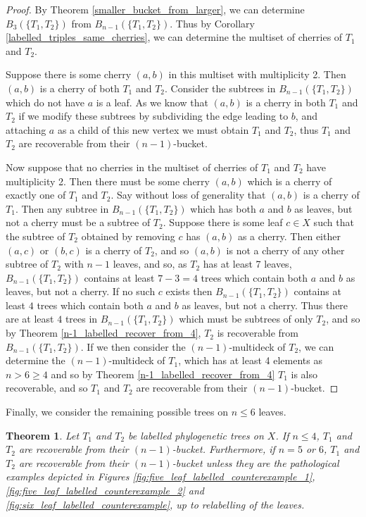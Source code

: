 \documentclass[12pt]{article}
\newtheorem{Theorem}{Theorem}[section]
\theoremstyle{definition}
\begin{document}
\begin{proof}
    By Theorem \ref{smaller_bucket_from_larger}, we can determine $B_3(\{T_1, T_2\})$ from $B_{n-1}(\{T_1, T_2\})$. Thus by Corollary \ref{labelled_triples_same_cherries}, we can determine the multiset of cherries of $T_1$ and $T_2$.
    
    Suppose there is some cherry $(a, b)$ in this multiset with multiplicity 2. Then $(a, b)$ is a cherry of both $T_1$ and $T_2$. Consider the subtrees in $B_{n-1}(\{T_1, T_2\})$ which do not have $a$ is a leaf. As we know that $(a, b)$ is a cherry in both $T_1$ and $T_2$ if we modify these subtrees by subdividing the edge leading to $b$, and attaching $a$ as a child of this new vertex we must obtain $T_1$ and $T_2$, thus $T_1$ and $T_2$ are recoverable from their $(n-1)$-bucket.
    
    Now suppose that no cherries in the multiset of cherries of $T_1$ and $T_2$ have multiplicity 2. Then there must be some cherry $(a, b)$ which is a cherry of exactly one of $T_1$ and $T_2$. Say without loss of generality that $(a, b)$ is a cherry of $T_1$. Then any subtree in $B_{n-1}(\{T_1, T_2\})$ which has both $a$ and $b$ as leaves, but not a cherry must be a subtree of $T_2$. Suppose there is some leaf $c \in X$ such that the subtree of $T_2$ obtained by removing $c$ has $(a, b)$ as a cherry. Then either $(a, c)$ or $(b, c)$ is a cherry of $T_2$, and so $(a, b)$ is not a cherry of any other subtree of $T_2$ with $n-1$ leaves, and so, as $T_2$ has at least 7 leaves, $B_{n-1}(\{T_1, T_2\})$ contains at least $7-3=4$ trees which contain both $a$ and $b$ as leaves, but not a cherry. If no such $c$ exists then $B_{n-1}(\{T_1, T_2\})$ contains at least $4$ trees which contain both $a$ and $b$ as leaves, but not a cherry. Thus there are at least $4$ trees in $B_{n-1}(\{T_1, T_2\})$ which must be subtrees of only $T_2$, and so by Theorem \ref{n-1_labelled_recover_from_4}, $T_2$ is recoverable from $B_{n-1}(\{T_1, T_2\})$. If we then consider the $(n-1)$-multideck of $T_2$, we can determine the $(n-1)$-multideck of $T_1$, which has at least 4 elements as $n>6 \geq 4$ and so by Theorem \ref{n-1_labelled_recover_from_4} $T_1$ is also recoverable, and so $T_1$ and $T_2$ are recoverable from their $(n-1)$-bucket.
\end{proof}

Finally, we consider the remaining possible trees on $n \le 6$ leaves.

\begin{Theorem}
    Let $T_1$ and $T_2$ be labelled phylogenetic trees on $X$. If $n \le 4$, $T_1$ and $T_2$ are recoverable from their $(n-1)$-bucket. Furthermore, if $n=5$ or $6$, $T_1$ and $T_2$ are recoverable from their $(n-1)$-bucket unless they are the pathological examples depicted in Figures \ref{fig:five_leaf_labelled_counterexample_1}, \ref{fig:five_leaf_labelled_counterexample_2} and \ref{fig:six_leaf_labelled_counterexample}, up to relabelling of the leaves.
\end{Theorem}
\end{document}
